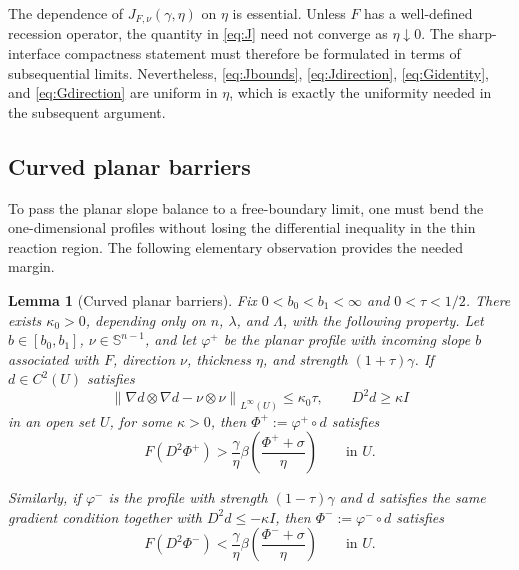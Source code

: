 \documentclass[11pt,letterpaper]{amsart}
\numberwithin{equation}{section}
\newcommand{\norm}[1]{\left\lVert #1\right\rVert}
\newtheorem{lemma}[theorem]{Lemma}
\theoremstyle{definition}
\theoremstyle{remark}
\begin{document}
The dependence of $J_{F,\nu}(\gamma,\eta)$ on $\eta$ is essential. Unless
$F$ has a well-defined recession operator, the quantity in \eqref{eq:J}
need not converge as $\eta\downarrow0$. The sharp-interface compactness
statement must therefore be formulated in terms of subsequential limits.
Nevertheless, \eqref{eq:Jbounds}, \eqref{eq:Jdirection},
\eqref{eq:Gidentity}, and \eqref{eq:Gdirection} are uniform in $\eta$,
which is exactly the uniformity needed in the subsequent argument.
\subsection{Curved planar barriers}

To pass the planar slope balance to a free-boundary limit, one must bend the
one-dimensional profiles without losing the differential inequality in the
thin reaction region. The following elementary observation provides the
needed margin.

\begin{lemma}[Curved planar barriers]\label{lem:curved-planar-barriers}
Fix $0<b_0<b_1<\infty$ and $0<\tau<1/2$. There exists
$\kappa_0>0$, depending only on $n$, $\lambda$, and $\Lambda$, with the
following property. Let $b\in[b_0,b_1]$, $\nu\in\mathbb S^{n-1}$, and let
$\varphi^+$ be the planar profile with incoming slope $b$ associated with
$F$, direction $\nu$, thickness $\eta$, and strength $(1+\tau)\gamma$. If
$d\in C^2(U)$ satisfies
$$
\norm{\nabla d\otimes\nabla d-\nu\otimes\nu}_{L^\infty(U)}
\leq
\kappa_0\tau,
\qquad
D^2d\geq\kappa I
$$
in an open set $U$, for some $\kappa>0$, then
$\Phi^+:=\varphi^+\circ d$ satisfies
\begin{equation}\label{eq:strict-lower-comparison}
F(D^2\Phi^+)
>
\frac{\gamma}{\eta}
\beta\left(\frac{\Phi^++\sigma}{\eta}\right)
\qquad\text{in }U.
\end{equation}

Similarly, if $\varphi^-$ is the profile with strength
$(1-\tau)\gamma$ and $d$ satisfies the same gradient condition together with
$D^2d\leq-\kappa I$, then $\Phi^-:=\varphi^-\circ d$ satisfies
\begin{equation}\label{eq:strict-upper-comparison}
F(D^2\Phi^-)
<
\frac{\gamma}{\eta}
\beta\left(\frac{\Phi^-+\sigma}{\eta}\right)
\qquad\text{in }U.
\end{equation}
\end{lemma}
\end{document}
